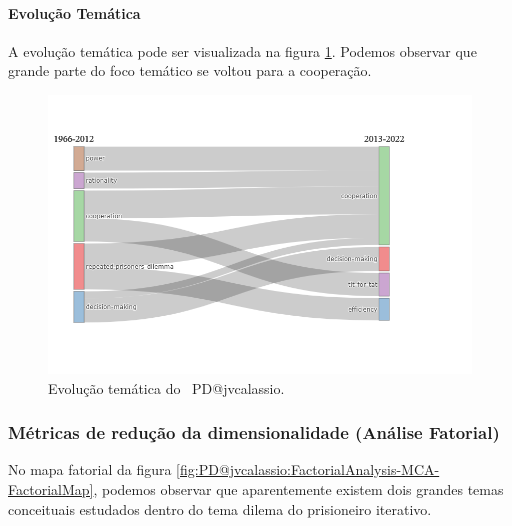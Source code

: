 \paragraph{Evolução Temática}

A evolução temática pode ser visualizada na figura \ref{fig:PD@jvcalassio:Thematic-Evolution}. Podemos observar que grande parte do foco temático se voltou para a cooperação.

\begin{figure}
    \centering
    \includegraphics[width=1\textwidth]{exploratory-data-analysis/jvcalassio/PesqBibliogr/PrisonersDilemma/WoS-20221201/Dataset/ThematicEvolution-2022-12-03.png}
    \caption{Evolução temática do  \dataset\ PD@jvcalassio.}
    \label{fig:PD@jvcalassio:Thematic-Evolution}
\end{figure}

\subsubsection{Métricas de redução da dimensionalidade (Análise Fatorial)}

No mapa fatorial da figura \ref{fig:PD@jvcalassio:FactorialAnalysis-MCA-FactorialMap}, podemos observar que aparentemente existem dois grandes temas conceituais estudados dentro do tema dilema do prisioneiro iterativo.

